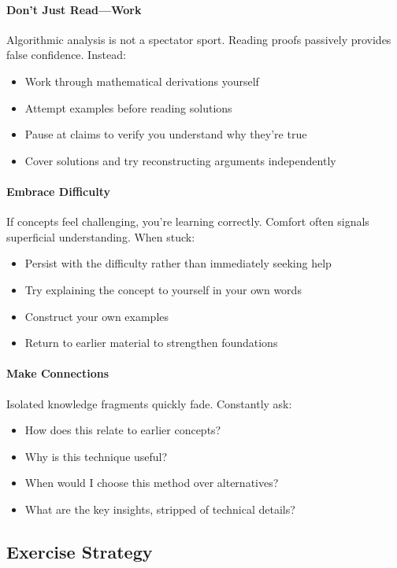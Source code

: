 \paragraph{Don't Just Read—Work}
Algorithmic analysis is not a spectator sport. Reading proofs passively provides false confidence. Instead:
\begin{itemize}
    \item Work through mathematical derivations yourself
    \item Attempt examples before reading solutions
    \item Pause at claims to verify you understand why they're true
    \item Cover solutions and try reconstructing arguments independently
\end{itemize}

\paragraph{Embrace Difficulty}
If concepts feel challenging, you're learning correctly. Comfort often signals superficial understanding. When stuck:
\begin{itemize}
    \item Persist with the difficulty rather than immediately seeking help
    \item Try explaining the concept to yourself in your own words
    \item Construct your own examples
    \item Return to earlier material to strengthen foundations
\end{itemize}

\paragraph{Make Connections}
Isolated knowledge fragments quickly fade. Constantly ask:
\begin{itemize}
    \item How does this relate to earlier concepts?
    \item Why is this technique useful?
    \item When would I choose this method over alternatives?
    \item What are the key insights, stripped of technical details?
\end{itemize}

\subsection{Exercise Strategy}

